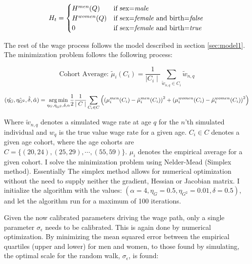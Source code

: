 \begin{equation}
    H_t = \begin{cases}
        H^{men}(Q) & \text{if sex=\textit{male}} \\
        H^{women}(Q) & \text{if sex=\textit{female} and birth=\textit{false}} \\
        0 & \text{if sex=\textit{female} and birth=\textit{true} }\\
    \end{cases}    
\end{equation}

The rest of the wage process follows the model described in section \ref{sec:model1}. The minimization problem follows the following process:

\begin{equation}
    \text{Cohort Average: } {\tilde{\mu}}_i (C_i) = \frac{1}{\mid C_i \mid} \sum_{\tilde{w}_{n, q} \in C_i} {\tilde{w}_{n, q}}
\end{equation}

\begin{equation}
 (\hat{\eta_G}, \hat{\eta_{G^2}}, \hat{\delta}, \hat{\alpha})   =  \underset{\eta_G, \eta_{G^2}, \delta, \alpha}{\operatorname*{arg\,min}}  \frac{1}{2}\frac{1}{\mid C \mid } \sum_{C_i \in C} \left(\left( \mu_{i}^{men}(C_i)  - \tilde{\mu}_i^{men}(C_i)\right)^2 + \left( \mu_{i}^{women}(C_i)  - \tilde{\mu}_i^{women}(C_i)\right)^2 \right)
\end{equation}

Where $\tilde{w}_{n, q}$ denotes a simulated wage rate at age $q$ for the $n$'th simulated individual and $w_q$ is the true value wage rate for a given age. $C_i \in C$ denotes a given age cohort, where the age cohorts are $C=\{(20, 24), (25, 29), \cdots , (55, 59) \}$. $\mu_i$ denotes the empirical average for a given cohort.
I solve the minimization problem using Nelder-Mead (Simplex method). Essentially The simplex method allows for numerical optimization without the need to supply neither the gradient, Hessian or Jacobian matrix. I initialize the algorithm with the values: $(\alpha=4, \eta_G = 0.5, \eta_{G^2}=0.01, \delta=0.5)$, and let the algorithm run for a maximum of 100 iterations. 

Given the now calibrated parameters driving the wage path, only a single parameter $\sigma_\epsilon$ needs to be calibrated. This is again done by numerical optimization. By minimizing the mean squared error between the empirical quartiles (upper and lower) for men and women, to those found by simulating, the optimal scale for the random walk, $\sigma_\epsilon$, is found:

